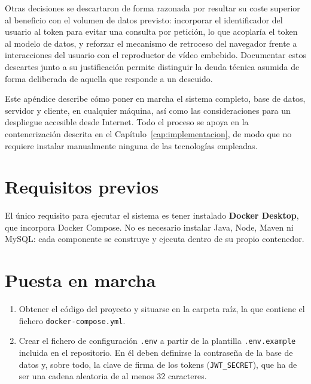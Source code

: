 \documentclass[12pt,a4paper,twoside,openright]{book}
\begin{document}
    Otras decisiones se descartaron de forma razonada por resultar su coste
    superior al beneficio con el volumen de datos previsto: incorporar el
    identificador del usuario al token para evitar una consulta por petición,
    lo que acoplaría el token al modelo de datos, y reforzar el mecanismo de
    retroceso del navegador frente a interacciones del usuario con el
    reproductor de vídeo embebido. Documentar estos descartes junto a su
    justificación permite distinguir la deuda técnica asumida de forma
    deliberada de aquella que responde a un descuido.


    \begin{umaappendices}


        Este apéndice describe cómo poner en marcha el sistema completo, base de
        datos, servidor y cliente, en cualquier máquina, así como las
        consideraciones para un despliegue accesible desde Internet. Todo el proceso
        se apoya en la contenerización descrita en el
        Capítulo~\ref{cap:implementacion}, de modo que no requiere instalar
        manualmente ninguna de las tecnologías empleadas.
    
        \section*{Requisitos previos}
    
        El único requisito para ejecutar el sistema es tener instalado
        \textbf{Docker Desktop}, que incorpora Docker Compose. No es necesario
        instalar Java, Node, Maven ni MySQL: cada componente se construye y ejecuta
        dentro de su propio contenedor.
    
        \section*{Puesta en marcha}
    
        \begin{enumerate}
            \item Obtener el código del proyecto y situarse en la carpeta raíz, la
            que contiene el fichero \texttt{docker-compose.yml}.
    
            \item Crear el fichero de configuración \texttt{.env} a partir de la
            plantilla \texttt{.env.example} incluida en el repositorio. En él deben
            definirse la contraseña de la base de datos y, sobre todo, la clave de
            firma de los tokens (\texttt{JWT\_SECRET}), que ha de ser una cadena
            aleatoria de al menos 32 caracteres.
    

\end{enumerate}
\end{umaappendices}
\end{document}
